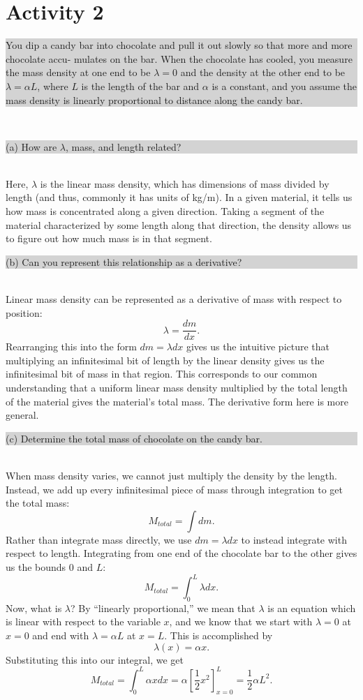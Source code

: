 \documentclass[]{article}
\newcommand{\excerpt}[1]{\colorbox{lightgray}{\parbox{14.8cm}{#1}} \\}
\begin{document}
\section*{Activity 2}
\excerpt{
You dip a candy bar into chocolate and pull it out slowly so that more and more chocolate accu- mulates on the bar. When the chocolate has cooled, you measure the mass density at one end to be $\lambda = 0$ and the density at the other end to be $\lambda = \alpha L$, where $L$ is the length of the bar and $\alpha$ is a constant, and you assume the mass density is linearly proportional to distance along the candy bar.
}
\excerpt{
(a) How are $\lambda$, mass, and length related?
}
Here, $\lambda$ is the linear mass density, which has dimensions of mass divided by length (and thus, commonly it has units of kg/m). In a given material, it tells us how mass is concentrated along a given direction. Taking a segment of the material characterized by some length along that direction, the density allows us to figure out how much mass is in that segment. \\
\excerpt{
(b) Can you represent this relationship as a derivative?
}
Linear mass density can be represented as a derivative of mass with respect to position:
\[
\lambda = \frac{dm}{dx}.
\]
Rearranging this into the form $dm = \lambda dx$ gives us the intuitive picture that multiplying an infinitesimal bit of length by the linear density gives us the infinitesimal bit of mass in that region. This corresponds to our common understanding that a uniform linear mass density multiplied by the total length of the material gives the material's total mass. The derivative form here is more general. \\
\excerpt{
(c) Determine the total mass of chocolate on the candy bar.
}
When mass density varies, we cannot just multiply the density by the length. Instead, we add up every infinitesimal piece of mass through integration to get the total mass:
\[
M_{total} = \int dm.
\]
Rather than integrate mass directly, we use $dm = \lambda dx$ to instead integrate with respect to length. Integrating from one end of the chocolate bar to the other gives us the bounds $0$ and $L$:
\[
M_{total} = \int_{0}^{L}\lambda dx.
\]
Now, what is $\lambda$? By ``linearly proportional,'' we mean that $\lambda$ is an equation which is linear with respect to the variable $x$, and we know that we start with $\lambda = 0$ at $x = 0$ and end with $\lambda = \alpha L$ at $x = L$. This is accomplished by
\[
\lambda(x) = \alpha x.
\]
Substituting this into our integral, we get
\[
M_{total} = \int_{0}^{L}\alpha x dx = \alpha \left[\frac{1}{2}x^{2}\right]_{x=0}^{L} = \frac{1}{2}\alpha L^{2}.
\]
\end{document}
